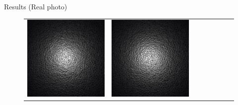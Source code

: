 \documentclass[final]{beamer}
\newlength{\twocolwid}
\newlength{\resultwidth}
\begin{document}
\begin{frame}[t]
\begin{columns}[t]
\begin{column}{\twocolwid}
\begin{block}{Results (Real photo)}
\begin{figure}[t]
\begin{tabular}{ccrclccc}
            		\includegraphics[width=\resultwidth]{images/real/leather/good2.jpg} &
            		\includegraphics[width=\resultwidth]{images/real/leather/good3.jpg} &

\end{tabular}
\end{figure}
\end{block}
\end{column}
\end{columns}
\end{frame}
\end{document}
